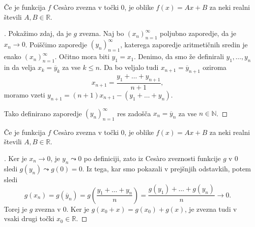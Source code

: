\documentclass[10pt,hyperref={unicode}]{beamer}
\newenvironment{dokaz}{\begin{proof}[\bfseries\upshape\proofname]}{\end{proof}}
\begin{document}
\begin{frame}
    \begin{block}{}
        Če je funkcija $f$ Ces\`{a}ro zvezna v točki $0$, je oblike $f(x) = Ax + B$ za neki realni števili $A, B \in \mathbb{R}$.
    \end{block}
    \begin{dokaz}\renewcommand{\qedsymbol}{}
        Pokažimo zdaj, da je $g$ zvezna. Naj bo $(x_n)_{n=1}^{\infty}$ poljubno zaporedje, da je $x_n \rightarrow 0$. Poiščimo zaporedje $(y_n)_{n=1}^{\infty}$, katerega zaporedje aritmetičnih sredin je enako $(x_n)_{n=1}^{\infty}$. 
        \pause
        Očitno mora biti $y_1 = x_1$. Denimo, da smo že definirali $y_1, \ldots, y_n$ in da velja $x_k = \overline{y}_k$ za vse $k \leq n$. Da bo veljalo tudi $x_{n+1} = \overline{y}_{n+1}$ oziroma 
        $$x_{n+1} = \frac{y_1 + \ldots + y_{n+1}}{n+1},$$ 
        moramo vzeti $y_{n+1} = (n+1)x_{n+1} - (y_1 + \ldots + y_n)$. 
        \pause
        
        Tako definirano zaporedje $(y_n)_{n=1}^{\infty}$ res zadošča $x_n = \overline{y}_n$ za vse $n \in \mathbb{N}$.
    \end{dokaz}
\end{frame}

\begin{frame}
    \begin{block}{}
        Če je funkcija $f$ Ces\`{a}ro zvezna v točki $0$, je oblike $f(x) = Ax + B$ za neki realni števili $A, B \in \mathbb{R}$.
    \end{block}
    \begin{dokaz}\renewcommand{\qedsymbol}{}
        Ker je $x_n \rightarrow 0$, je $y_n \leadsto 0$ po definiciji, zato iz Ces\`{a}ro zveznosti funkcije $g$ v $0$ sledi $g(y_n) \leadsto g(0) = 0$. 
        \pause
        Iz tega, kar smo pokazali v prejšnjih odstavkih, potem sledi 
        $$g(x_n) = g(\overline{y}_n) = g\left( \frac{y_1 + \ldots + y_n}{n} \right) = \frac{g(y_1) + \ldots + g(y_n)}{n} \rightarrow 0.$$
        Torej je $g$ zvezna v $0$. 
        \pause
        Ker je $g(x_0 + x) = g(x_0) + g(x)$, je zvezna tudi v vsaki drugi točki $x_0 \in \mathbb{R}$.
    \end{dokaz}
\end{frame}
\end{document}
